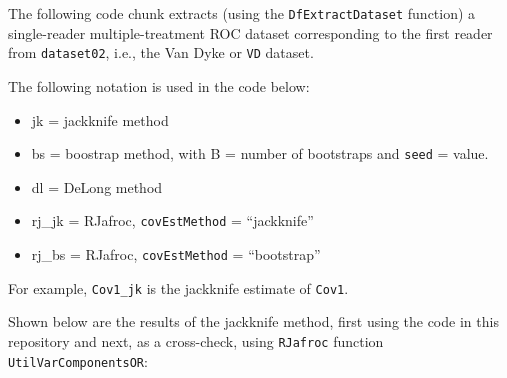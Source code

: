 \documentclass[
]{book}
\newenvironment{Shaded}{\begin{snugshade}}{\end{snugshade}}
\newcommand{\CommentTok}[1]{\textcolor[rgb]{0.56,0.35,0.01}{\textit{#1}}}
\newcommand{\DataTypeTok}[1]{\textcolor[rgb]{0.13,0.29,0.53}{#1}}
\newcommand{\DecValTok}[1]{\textcolor[rgb]{0.00,0.00,0.81}{#1}}
\newcommand{\KeywordTok}[1]{\textcolor[rgb]{0.13,0.29,0.53}{\textbf{#1}}}
\newcommand{\NormalTok}[1]{#1}
\newcommand{\OperatorTok}[1]{\textcolor[rgb]{0.81,0.36,0.00}{\textbf{#1}}}
\newcommand{\StringTok}[1]{\textcolor[rgb]{0.31,0.60,0.02}{#1}}
\providecommand{\tightlist}{%
  \setlength{\itemsep}{0pt}\setlength{\parskip}{0pt}}
\begin{document}
The following code chunk extracts (using the \texttt{DfExtractDataset} function) a single-reader multiple-treatment ROC dataset corresponding to the first reader from \texttt{dataset02}, i.e., the Van Dyke or \texttt{VD} dataset.

\begin{Shaded}
\end{Shaded}

The following notation is used in the code below:

\begin{itemize}
\tightlist
\item
  jk = jackknife method
\item
  bs = boostrap method, with B = number of bootstraps and \texttt{seed} = value.
\item
  dl = DeLong method
\item
  rj\_jk = RJafroc, \texttt{covEstMethod} = ``jackknife''
\item
  rj\_bs = RJafroc, \texttt{covEstMethod} = ``bootstrap''
\end{itemize}

For example, \texttt{Cov1\_jk} is the jackknife estimate of \texttt{Cov1}.

Shown below are the results of the jackknife method, first using the code in this repository and next, as a cross-check, using \texttt{RJafroc} function \texttt{UtilVarComponentsOR}:
\end{document}
